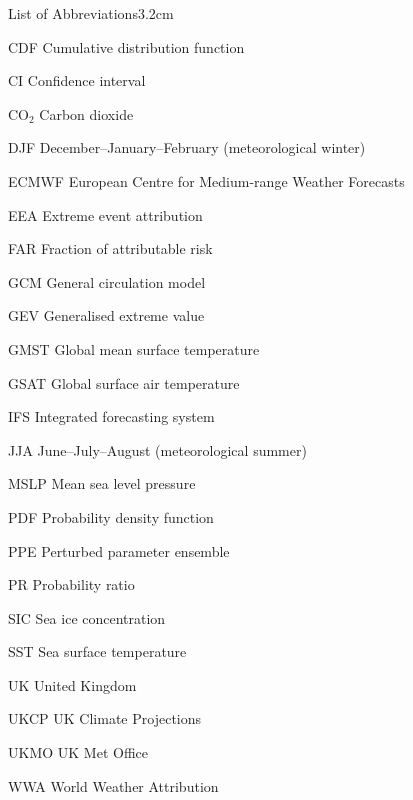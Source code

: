 \begin{mclistof}{List of Abbreviations}{3.2cm}

    \item[CDF] Cumulative distribution function
    \item[CI] Confidence interval 
    \item[CO$_2$] Carbon dioxide
    \item[DJF] December--January--February (meteorological winter)
    \item[ECMWF] European Centre for Medium-range Weather Forecasts
    \item[EEA] Extreme event attribution
    \item[FAR] Fraction of attributable risk
    \item[GCM] General circulation model
    \item[GEV] Generalised extreme value
    \item[GMST] Global mean surface temperature
    \item[GSAT] Global surface air temperature
    \item[IFS] Integrated forecasting system
    \item[JJA] June--July--August (meteorological summer)
    \item[MSLP] Mean sea level pressure
    \item[PDF] Probability density function
    \item[PPE] Perturbed parameter ensemble
    \item[PR] Probability ratio
    \item[SIC] Sea ice concentration
    \item[SST] Sea surface temperature
    \item[UK] United Kingdom
    \item[UKCP] UK Climate Projections
    \item[UKMO] UK Met Office
    \item[WWA] World Weather Attribution

\end{mclistof}
